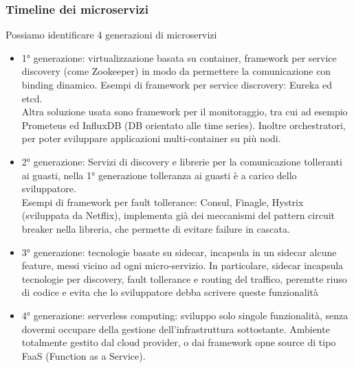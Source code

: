 \documentclass{article}
\begin{document}
\subsubsection{Timeline dei microservizi}
Possiamo identificare 4 generazioni di microservizi
\begin{itemize}
\item 1° generazione: virtualizzazione basata su container, framework per service discovery (come Zookeeper) in modo da permettere la comunicazione con binding dinamico. Esempi di framework per service discrovery: Eureka ed etcd.\\ Altra soluzione usata sono framework per il monitoraggio, tra cui ad esempio Prometeus ed InfluxDB (DB orientato alle time series). Inoltre orchestratori, per poter sviluppare applicazioni multi-container su più nodi.
\item 2° generazione: Servizi di discovery e librerie per la comunicazione tolleranti ai guasti, nella 1° generazione tolleranza ai guasti è a carico dello sviluppatore.\\ Esempi di framework per fault tollerance: Consul, Finagle, Hystrix (sviluppata da Netflix), implementa già dei meccanismi del pattern circuit breaker nella libreria, che permette di evitare failure in cascata.
\item 3° generazione: tecnologie basate su sidecar, incapsula in un sidecar alcune feature, messi vicino ad ogni micro-servizio. In particolare, sidecar incapsula tecnologie per discovery, fault tollerance e routing del traffico, peremtte riuso di codice e evita che lo sviluppatore debba scrivere queste funzionalità
\item 4° generazione: serverless computing: sviluppo solo singole funzionalità, senza dovermi occupare della gestione dell'infrastruttura sottostante. Ambiente totalmente gestito dal cloud provider, o dai framework opne source di tipo FaaS (Function as a Service).
\end{itemize}
\end{document}
